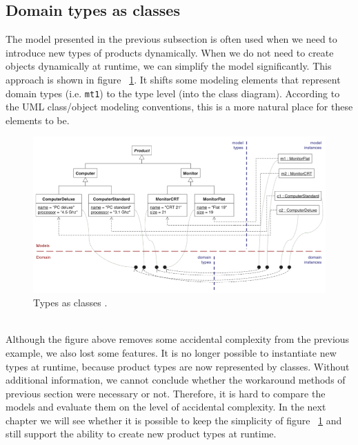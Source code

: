 \subsection{Domain types as classes}

The model presented in the previous subsection is often used when we need to introduce new types of products dynamically. When we do not need to create objects dynamically at runtime, we can simplify the model significantly. This approach is shown in figure ~\ref{fig:types_classes}. It shifts some modeling elements that represent domain types (i.e. \texttt{mt1}) to the type level (into the class diagram). According to the UML class/object modeling conventions, this is a more natural place for these elements to be.
\begin{figure}[h!]
\centering
\includegraphics[width=1.0\textwidth]{images/chap2_types_classes.png}
\caption{Types as classes \cite{AccidentalComplexity}.}
\label{fig:types_classes}
\end{figure} \\
Although the figure above removes some accidental complexity from the previous example, we also lost some features. It is no longer possible to instantiate new types at runtime, because product types are now represented by classes. Without additional information, we cannot conclude whether the workaround methods of previous section were necessary or not. Therefore, it is hard to compare the models and evaluate them on the level of accidental complexity. In the next chapter we will see whether it is possible to keep the simplicity of figure ~\ref{fig:types_classes} and still support the ability to create new product types at runtime.
